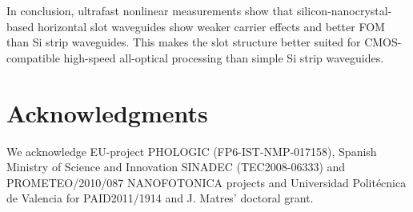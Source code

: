 \documentclass[10pt,letterpaper]{article}
\begin{document}
In conclusion, ultrafast nonlinear measurements show that silicon-nanocrystal-based horizontal slot waveguides show weaker carrier effects and better FOM than Si strip waveguides. This makes the slot structure better suited for CMOS-compatible high-speed all-optical processing than simple Si strip waveguides.




\section*{Acknowledgments}
We acknowledge EU-project PHOLOGIC (FP6-IST-NMP-017158), Spanish Ministry of Science and Innovation SINADEC (TEC2008-06333) and PROMETEO/2010/087 NANOFOTONICA projects and Universidad Polit\'ecnica de Valencia for PAID2011/1914 and J. Matres' doctoral grant.
\end{document}

